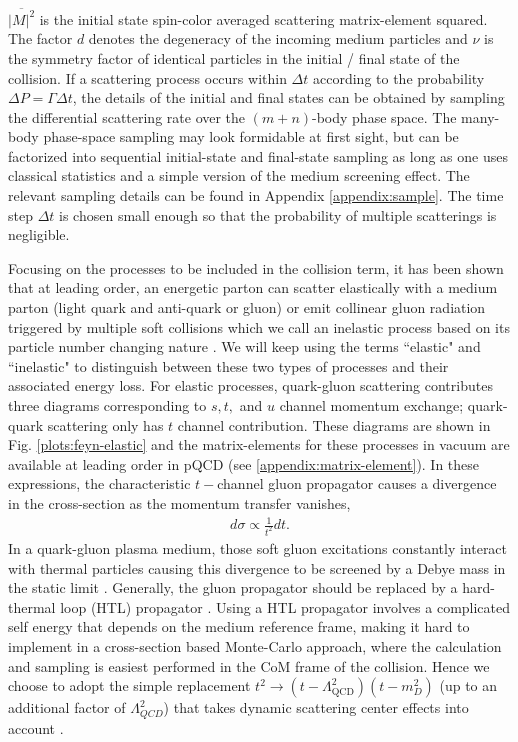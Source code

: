 \documentclass[aps, prc, reprint, amsmath, groupedaddress, nofootinbib]{revtex4-1}
\begin{document}
$\overline{|M|^2}$ is the initial state spin-color averaged scattering matrix-element squared.
The factor $d$ denotes the degeneracy of the incoming medium particles and $\nu$ is the symmetry factor of identical particles in the initial / final state of the collision.
If a scattering process occurs within $\Delta t$ according to the probability $\Delta P=\Gamma \Delta t$, the details of the initial and final states can be obtained by sampling the differential scattering rate over the $(m+n)$-body phase space.
The many-body phase-space sampling may look formidable at first sight, but can be factorized into sequential initial-state and final-state sampling as long as one uses classical statistics and a simple version of the medium screening effect.
The relevant sampling details can be found in Appendix \ref{appendix:sample}.
The time step $\Delta t$ is chosen small enough so that the probability of multiple scatterings is negligible. 

Focusing on the processes to be included in the collision term, 
it has been shown that at leading order, an energetic parton can scatter elastically with a medium parton (light quark and anti-quark or gluon) or emit collinear gluon radiation triggered by multiple soft collisions which we call an inelastic process based on its particle number changing nature \cite{Arnold:2002zm}.
We will keep using the terms ``elastic" and ``inelastic" to distinguish between these two types of processes and their associated energy loss.
For elastic processes, quark-gluon scattering contributes three diagrams corresponding to $s, t,$ and $u$ channel momentum exchange; quark-quark scattering only has $t$ channel contribution. 
These diagrams are shown in Fig. \ref{plots:feyn-elastic} and the matrix-elements for these processes in vacuum are available at leading order in pQCD (see \ref{appendix:matrix-element}).
In these expressions, the characteristic $t-$channel gluon propagator causes a divergence in the cross-section as the momentum transfer vanishes,
\begin{eqnarray}
d\sigma \propto \frac{1}{t^2} dt.
\end{eqnarray}
In a quark-gluon plasma medium, those soft gluon excitations constantly interact with thermal particles causing this divergence to be screened by a Debye mass in the static limit \cite{Moore:2004tg}.
Generally, the gluon propagator should be replaced by a hard-thermal loop (HTL) propagator \cite{Peshier:1998dy}.
Using a HTL propagator involves a complicated self energy that depends on the medium reference frame, making it hard to implement in a cross-section based Monte-Carlo approach, where the calculation and sampling is easiest performed in the CoM frame of the collision.
Hence we choose to adopt the simple replacement $t^2 \rightarrow (t-\Lambda_{\textrm{QCD}}^2)(t - m_D^2)$ (up to an additional factor of $\Lambda_{QCD}^2$) that takes dynamic scattering center effects into account \cite{Djordjevic:2008iz}.
\end{document}
